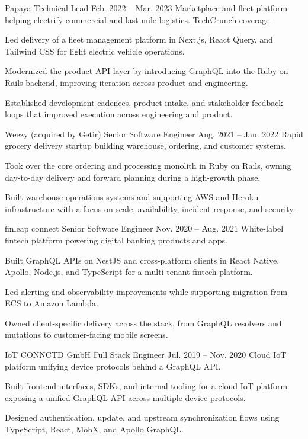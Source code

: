 \ResumeJob
  {Papaya}
  {Technical Lead}
  {Feb. 2022 -- Mar. 2023}
  {Marketplace and fleet platform helping electrify commercial and last-mile logistics. \href{https://techcrunch.com/2022/09/27/papaya-wants-to-help-electrify-last-mile-logistics-in-europe/}{TechCrunch coverage}.}
\begin{ResumeList}
  \item Led delivery of a fleet management platform in Next.js, React Query, and Tailwind CSS for light electric vehicle operations.
  \item Modernized the product API layer by introducing GraphQL into the Ruby on Rails backend, improving iteration across product and engineering.
  \item Established development cadences, product intake, and stakeholder feedback loops that improved execution across engineering and product.
\end{ResumeList}

\ResumeJob
  {Weezy (acquired by Getir)}
  {Senior Software Engineer}
  {Aug. 2021 -- Jan. 2022}
  {Rapid grocery delivery startup building warehouse, ordering, and customer systems.}
\begin{ResumeList}
  \item Took over the core ordering and processing monolith in Ruby on Rails, owning day-to-day delivery and forward planning during a high-growth phase.
  \item Built warehouse operations systems and supporting AWS and Heroku infrastructure with a focus on scale, availability, incident response, and security.
\end{ResumeList}

\newpage
\ResumeJob
  {finleap connect}
  {Senior Software Engineer}
  {Nov. 2020 -- Aug. 2021}
  {White-label fintech platform powering digital banking products and apps.}
\begin{ResumeList}
  \item Built GraphQL APIs on NestJS and cross-platform clients in React Native, Apollo, Node.js, and TypeScript for a multi-tenant fintech platform.
  \item Led alerting and observability improvements while supporting migration from ECS to Amazon Lambda.
  \item Owned client-specific delivery across the stack, from GraphQL resolvers and mutations to customer-facing mobile screens.
\end{ResumeList}

\ResumeJob
  {IoT CONNCTD GmbH}
  {Full Stack Engineer}
  {Jul. 2019 -- Nov. 2020}
  {Cloud IoT platform unifying device protocols behind a GraphQL API.}
\begin{ResumeList}
  \item Built frontend interfaces, SDKs, and internal tooling for a cloud IoT platform exposing a unified GraphQL API across multiple device protocols.
  \item Designed authentication, update, and upstream synchronization flows using TypeScript, React, MobX, and Apollo GraphQL.
\end{ResumeList}

